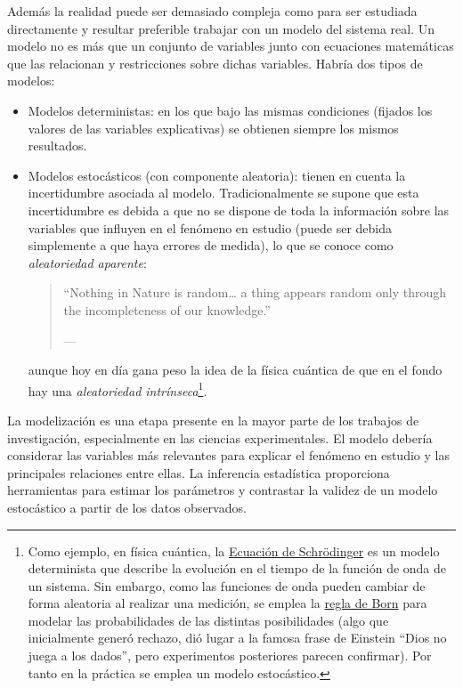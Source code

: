 \documentclass[
  spanish,
  10pt,
]{book}
\theoremstyle{break}
\theoremstyle{nonumberplain}
\let\oldfootnote\footnote
\renewcommand\footnote[1]{\oldfootnote{\hspace{2mm}#1}}
\begin{document}
Además la realidad puede ser demasiado compleja como para ser estudiada directamente y resultar preferible trabajar con un modelo del sistema real.
Un modelo no es más que un conjunto de variables junto con ecuaciones matemáticas que las relacionan y restricciones sobre dichas variables.
Habría dos tipos de modelos:

\begin{itemize}
\item
  Modelos deterministas: en los que bajo las mismas condiciones (fijados los valores de las variables explicativas) se obtienen siempre los mismos resultados.
\item
  Modelos estocásticos (con componente aleatoria): tienen en cuenta la incertidumbre asociada al modelo. Tradicionalmente se supone que esta incertidumbre es debida a que no se dispone de toda la información sobre las variables que influyen en el fenómeno en estudio (puede ser debida simplemente a que haya errores de medida), lo que se conoce como \emph{aleatoriedad aparente}:

  \begin{quote}
  ``Nothing in Nature is random\ldots{} a thing appears random only through the incompleteness of our knowledge.''

  --- \citet{spinoza1667ethics}
  \end{quote}

  aunque hoy en día gana peso la idea de la física cuántica de que en el fondo hay una \emph{aleatoriedad intrínseca}\footnote{Como ejemplo, en física cuántica, la \href{https://es.wikipedia.org/wiki/Ecuaci\%C3\%B3n_de_Schr\%C3\%B6dinger}{Ecuación de Schrödinger} es un modelo determinista que describe la evolución en el tiempo de la función de onda de un sistema. Sin embargo, como las funciones de onda pueden cambiar de forma aleatoria al realizar una medición, se emplea la \href{https://es.wikipedia.org/wiki/Regla_de_Born}{regla de Born} para modelar las probabilidades de las distintas posibilidades (algo que inicialmente generó rechazo, dió lugar a la famosa frase de Einstein ``Dios no juega a los dados'', pero experimentos posteriores parecen confirmar). Por tanto en la práctica se emplea un modelo estocástico.}.
\end{itemize}

La modelización es una etapa presente en la mayor parte de los trabajos de investigación, especialmente en las ciencias experimentales.
El modelo debería considerar las variables más relevantes para explicar el fenómeno en estudio y las principales relaciones entre ellas.
La inferencia estadística proporciona herramientas para estimar los parámetros y contrastar la validez de un modelo estocástico a partir de los datos observados.
\end{document}
